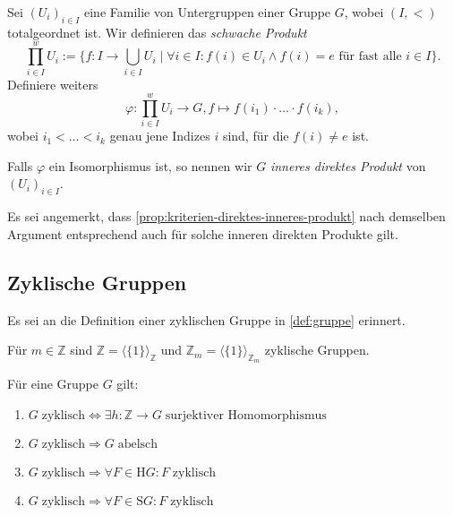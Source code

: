 \begin{remark}
    Sei $(U_i)_{i \in I}$ eine Familie von Untergruppen einer Gruppe $G$, wobei $(I, <)$ totalgeordnet ist. Wir definieren das \emph{schwache Produkt} 
    $$ \prod_{i \in I}^w U_i := \{ f : I \to \bigcup_{i \in I} U_i \mid \forall i \in I: f(i) \in U_i \land f(i) = e \textrm{ für fast alle } i \in I \}. $$
    Definiere weiters
    $$ \varphi : \prod_{i \in I}^w U_i \to G, f \mapsto f(i_1) \cdot \hdots \cdot f(i_k), $$
    wobei $i_1 < \hdots < i_k $ genau jene Indizes $i$ sind, für die $f(i) \neq e$ ist.

    Falls $\varphi$ ein Isomorphismus ist, so nennen wir $G$ \emph{inneres direktes Produkt} von $(U_i)_{i \in I}$.

    Es sei angemerkt, dass \cref{prop:kriterien-direktes-inneres-produkt} nach demselben Argument entsprechend auch für solche inneren direkten Produkte gilt.
\end{remark}


\subsection{Zyklische Gruppen}

Es sei an die Definition einer zyklischen Gruppe in \cref{def:gruppe} erinnert.

\begin{example}
    Für $m\in\mathbb{Z}$ sind $\mathbb{Z} = \langle \{1\}\rangle_{\mathbb{Z}}$ und $\mathbb{Z}_m = \langle\{1\}\rangle_{\mathbb{Z}_m}$ zyklische Gruppen.
\end{example}

\begin{proposition}\label{prop:zyklische_gruppen_1} Für eine Gruppe $G$ gilt:
    \begin{enumerate}
        \item $G\;\text{zyklisch} \Leftrightarrow \exists h: \mathbb{Z} \to G\;\text{surjektiver Homomorphismus}$
        \item $G\;\text{zyklisch} \Rightarrow G\;\text{abelsch}$
        \item $G\;\text{zyklisch} \Rightarrow \forall F \in \mathrm{H}G: F\;\text{zyklisch}$
        \item $G\;\text{zyklisch} \Rightarrow \forall F \in \mathrm{S}G: F\;\text{zyklisch}$
    \end{enumerate}
\end{proposition}

